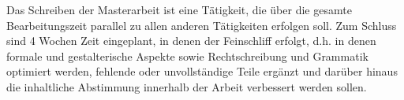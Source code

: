 Das Schreiben der Masterarbeit ist eine Tätigkeit, die über die gesamte Bearbeitungszeit parallel zu allen anderen Tätigkeiten erfolgen soll. Zum Schluss sind 4 Wochen Zeit eingeplant, in denen der Feinschliff erfolgt, d.h. in denen formale und gestalterische Aspekte sowie Rechtschreibung und Grammatik optimiert werden, fehlende oder unvollständige Teile ergänzt und darüber hinaus die inhaltliche Abstimmung innerhalb der Arbeit verbessert werden sollen.


